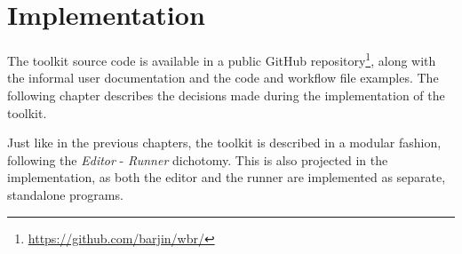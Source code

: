 \chapter{Implementation}

The toolkit source code is available in a public GitHub repository\footnote{\href{https://github.com/barjin/wbr/}{https://github.com/barjin/wbr/}},
along with the informal user documentation and the code and workflow file examples.
The following chapter describes the decisions made during the implementation of the toolkit.

Just like in the previous chapters, the toolkit is described in a modular fashion, following the \textit{Editor} - \textit{Runner} dichotomy.
This is also projected in the implementation, as both the editor and the runner are implemented as separate, standalone programs.




